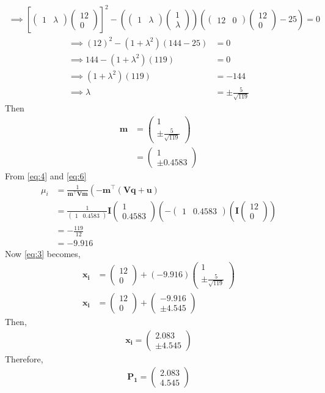 \documentclass[12pt]{article}
\providecommand{\sbrak}[1]{\ensuremath{{}\left[#1\right]}}
\providecommand{\brak}[1]{\ensuremath{\left(#1\right)}}
\providecommand{\lbrak}[1]{\ensuremath{\left(#1\right.}}
\providecommand{\brak}[1]{\ensuremath{\left(#1\right)}}
\newcommand{\myvec}[1]{\ensuremath{\begin{pmatrix}#1\end{pmatrix}}}
\let\vec\mathbf
\begin{document}
\begin{enumerate}
\begin{align}
\end{align}
\begin{align}
\implies\sbrak{\myvec{1 & \lambda}\myvec{12 \\ 0}}^2 - \brak{\myvec{1 & \lambda}\myvec{1 \\ \lambda}}\brak{\myvec{12 & 0}\myvec{12 \\ 0}-25}=0
	\end{align}      
	\begin{align}
		\implies\brak{12}^2-\brak{1+\lambda^2}\brak{144-25} &= 0\\
	\implies144 - \brak{1+\lambda^2}\brak{119} &= 0 \\
	\implies\brak{1+\lambda^2}\brak{119} &= -144 \\
	\implies\lambda &= \pm \frac{5}{\sqrt{119}}
\end{align}
Then
\begin{align}
	\vec{m} &= \myvec{1 \\ \pm \frac{5}{\sqrt{119}}}\\
	&=\myvec{1\\ \pm 0.4583}
\end{align}
From \eqref{eq:4} and \eqref{eq:6}
\begin{align}
	\mu_i &= \frac{1}{\vec{m}^{\top}\vec{V}\vec{m}}\lbrak{-\vec{m}^{\top}\brak{\vec{V}\vec{q}+\vec{u}}}\\
	&= \frac{1}{\myvec{1 & 0.4583}}\vec{I}\myvec{1 \\ 0.4583}\lbrak{-\myvec{1 & 0.4583}\brak{\vec{I}\myvec{12 \\ 0}}} \\
	&= -\frac{119}{12}\\
	&=-9.916
\end{align}
Now \eqref{eq:3} becomes,
\begin{align}
	\vec{x_i} &= \myvec{12 \\ 0}+(-9.916)\myvec{1 \\ \pm \frac{5}{\sqrt{119}}}\\
\vec{x_i} &= \myvec{12 \\ 0}+\myvec{-9.916 \\ \pm 4.545}
\end{align}
Then,
\begin{align}
\vec{x_i} = \myvec{2.083\\ \pm 4.545}
\end{align}
Therefore,
\begin{align}
\vec{P_1} = \myvec{2.083 \\ 4.545} \\

\end{align}
\end{enumerate}
\end{document}
